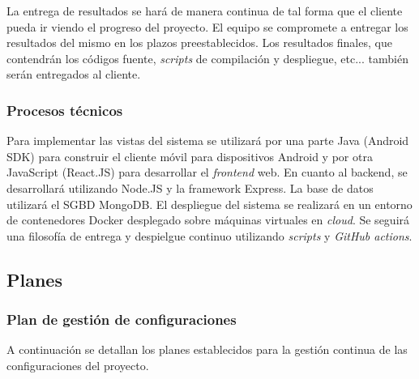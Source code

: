 \documentclass{article}
\begin{document}

La entrega de resultados se hará de manera continua de tal forma que el cliente pueda ir viendo el progreso del proyecto. 
El equipo se compromete a entregar los resultados del mismo en los plazos preestablecidos. 
Los resultados finales, que contendrán los códigos fuente, \textit{scripts} de compilación y despliegue, etc... también serán entregados al cliente.

\subsubsection{Procesos técnicos}
Para implementar las vistas del sistema se utilizará por una parte Java (Android SDK) para construir el cliente móvil para dispositivos Android 
y por otra JavaScript (React.JS) para desarrollar el \textit{frontend} web.
En cuanto al backend, se desarrollará utilizando Node.JS y la framework Express. La base de datos utilizará el SGBD MongoDB.
El despliegue del sistema se realizará en un entorno de contenedores Docker desplegado sobre máquinas virtuales en \textit{cloud}.
Se seguirá una filosofía de entrega y despielgue continuo utilizando \textit{scripts} y \textit{GitHub actions}.
\subsection{Planes}

\subsubsection{Plan de gestión de configuraciones}
A continuación se detallan los planes establecidos para la gestión continua de las configuraciones del 
proyecto.
\end{document}
